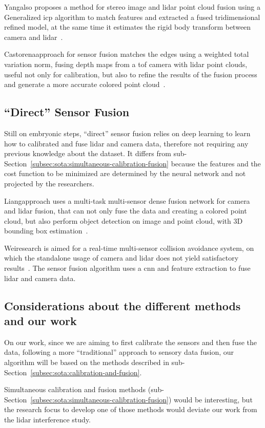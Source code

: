 Yang\etal also proposes a method for stereo image and \ac{lidar} point cloud fusion using a Generalized \acl{icp} algorithm to match features and extracted a fused tridimensional refined model, at the same time it estimates the rigid body transform between camera and \ac{lidar}~\cite{Yang2017}.

Castorena\etal approach for sensor fusion matches the edges using a weighted total variation norm, fusing depth maps from a \ac{tof} camera with \ac{lidar} point clouds, useful not only for calibration, but also to refine the results of the fusion process and generate a more accurate colored point cloud~\cite{Castorena2016}.

\subsection{``Direct'' Sensor Fusion}
Still on embryonic steps, ``direct'' sensor fusion relies on deep learning to learn how to calibrated and fuse \ac{lidar} and camera data, therefore not requiring any previous knowledge about the dataset. It differs from sub-Section~\ref{subsec:sota:simultaneous-calibration-fusion} because the features and the cost function to be minimized are determined by the neural network and not projected by the researchers.

Liang\etal approach uses a multi-task multi-sensor dense fusion network for camera and \ac{lidar} fusion, that can not only fuse the data and creating a colored point cloud, but also perform object detection on image and point cloud, with 3D bounding box estimation~\cite{Liang2019}.

Wei\etal research is aimed for a real-time multi-sensor collision avoidance system, on which the standalone usage of camera and \ac{lidar} does not yield satisfactory results~\cite{Wei2018}. The sensor fusion algorithm uses a \ac{cnn} and feature extraction to fuse \ac{lidar} and camera data. 

\subsection{Considerations about the different methods and our work}
On our work, since we are aiming to first calibrate the sensors and then fuse the data, following a more ``traditional'' approach to sensory data fusion, our algorithm will be based on the methods described in sub-Section~\ref{subsec:sota:calibration-and-fusion}. 

Simultaneous calibration and fusion methods (sub-Section~\ref{subsec:sota:simultaneous-calibration-fusion}) would be interesting, but the research focus to develop one of those methods would deviate our work from the \ac{lidar} interference study.

